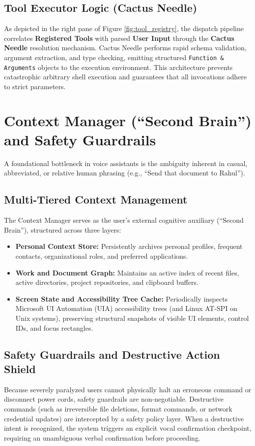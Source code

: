 \documentclass[12pt,a4paper]{report}
\begin{document}
\subsection{Tool Executor Logic (Cactus Needle)}
As depicted in the right pane of Figure \ref{fig:tool_registry}, the dispatch pipeline correlates \textbf{Registered Tools} with parsed \textbf{User Input} through the \textbf{Cactus Needle} resolution mechanism. Cactus Needle performs rapid schema validation, argument extraction, and type checking, emitting structured \texttt{Function \& Arguments} objects to the execution environment. This architecture prevents catastrophic arbitrary shell execution and guarantees that all invocations adhere to strict parameters.

\section{Context Manager (``Second Brain'') and Safety Guardrails}
A foundational bottleneck in voice assistants is the ambiguity inherent in casual, abbreviated, or relative human phrasing (e.g., ``Send that document to Rahul''). 

\subsection{Multi-Tiered Context Management}
The Context Manager serves as the user's external cognitive auxiliary (``Second Brain''), structured across three layers:
\begin{itemize}
    \item \textbf{Personal Context Store:} Persistently archives personal profiles, frequent contacts, organizational roles, and preferred applications.
    \item \textbf{Work and Document Graph:} Maintains an active index of recent files, active directories, project repositories, and clipboard buffers.
    \item \textbf{Screen State and Accessibility Tree Cache:} Periodically inspects Microsoft UI Automation (UIA) accessibility trees (and Linux AT-SPI on Unix systems), preserving structural snapshots of visible UI elements, control IDs, and focus rectangles.
\end{itemize}

\subsection{Safety Guardrails and Destructive Action Shield}
Because severely paralyzed users cannot physically halt an erroneous command or disconnect power cords, safety guardrails are non-negotiable. Destructive commands (such as irreversible file deletions, format commands, or network credential updates) are intercepted by a safety policy layer. When a destructive intent is recognized, the system triggers an explicit vocal confirmation checkpoint, requiring an unambiguous verbal confirmation before proceeding.
\end{document}
